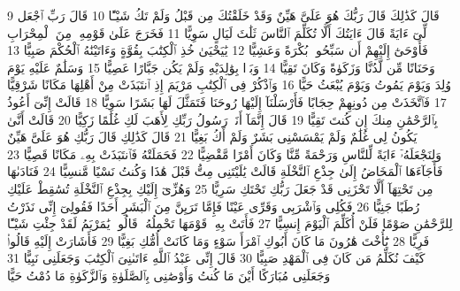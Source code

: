 {\tiny\colorbox{cl_aya}{9}} قَالَ كَذَٰلِكَ قَالَ رَبُّكَ هُوَ عَلَىَّ هَيِّنٌ وَقَدْ خَلَقْتُكَ مِن قَبْلُ وَلَمْ تَكُ شَيْـًٔا
{\tiny\colorbox{cl_aya}{10}} قَالَ رَبِّ ٱجْعَل لِّىٓ ءَايَةً قَالَ ءَايَتُكَ أَلَّا تُكَلِّمَ ٱلنَّاسَ ثَلَٰثَ لَيَالٍ سَوِيًّا
{\tiny\colorbox{cl_aya}{11}} فَخَرَجَ عَلَىٰ قَوْمِهِۦ مِنَ ٱلْمِحْرَابِ فَأَوْحَىٰٓ إِلَيْهِمْ أَن سَبِّحُوا۟ بُكْرَةً وَعَشِيًّا
{\tiny\colorbox{cl_aya}{12}} يَٰيَحْيَىٰ خُذِ ٱلْكِتَٰبَ بِقُوَّةٍ وَءَاتَيْنَٰهُ ٱلْحُكْمَ صَبِيًّا
{\tiny\colorbox{cl_aya}{13}} وَحَنَانًا مِّن لَّدُنَّا وَزَكَوٰةً وَكَانَ تَقِيًّا
{\tiny\colorbox{cl_aya}{14}} وَبَرًّۢا بِوَٰلِدَيْهِ وَلَمْ يَكُن جَبَّارًا عَصِيًّا
{\tiny\colorbox{cl_aya}{15}} وَسَلَٰمٌ عَلَيْهِ يَوْمَ وُلِدَ وَيَوْمَ يَمُوتُ وَيَوْمَ يُبْعَثُ حَيًّا
{\tiny\colorbox{cl_aya}{16}} وَٱذْكُرْ فِى ٱلْكِتَٰبِ مَرْيَمَ إِذِ ٱنتَبَذَتْ مِنْ أَهْلِهَا مَكَانًا شَرْقِيًّا
{\tiny\colorbox{cl_aya}{17}} فَٱتَّخَذَتْ مِن دُونِهِمْ حِجَابًا فَأَرْسَلْنَآ إِلَيْهَا رُوحَنَا فَتَمَثَّلَ لَهَا بَشَرًا سَوِيًّا
{\tiny\colorbox{cl_aya}{18}} قَالَتْ إِنِّىٓ أَعُوذُ بِٱلرَّحْمَٰنِ مِنكَ إِن كُنتَ تَقِيًّا
{\tiny\colorbox{cl_aya}{19}} قَالَ إِنَّمَآ أَنَا۠ رَسُولُ رَبِّكِ لِأَهَبَ لَكِ غُلَٰمًا زَكِيًّا
{\tiny\colorbox{cl_aya}{20}} قَالَتْ أَنَّىٰ يَكُونُ لِى غُلَٰمٌ وَلَمْ يَمْسَسْنِى بَشَرٌ وَلَمْ أَكُ بَغِيًّا
{\tiny\colorbox{cl_aya}{21}} قَالَ كَذَٰلِكِ قَالَ رَبُّكِ هُوَ عَلَىَّ هَيِّنٌ وَلِنَجْعَلَهُۥٓ ءَايَةً لِّلنَّاسِ وَرَحْمَةً مِّنَّا وَكَانَ أَمْرًا مَّقْضِيًّا
{\tiny\colorbox{cl_aya}{22}} فَحَمَلَتْهُ فَٱنتَبَذَتْ بِهِۦ مَكَانًا قَصِيًّا
{\tiny\colorbox{cl_aya}{23}} فَأَجَآءَهَا ٱلْمَخَاضُ إِلَىٰ جِذْعِ ٱلنَّخْلَةِ قَالَتْ يَٰلَيْتَنِى مِتُّ قَبْلَ هَٰذَا وَكُنتُ نَسْيًا مَّنسِيًّا
{\tiny\colorbox{cl_aya}{24}} فَنَادَىٰهَا مِن تَحْتِهَآ أَلَّا تَحْزَنِى قَدْ جَعَلَ رَبُّكِ تَحْتَكِ سَرِيًّا
{\tiny\colorbox{cl_aya}{25}} وَهُزِّىٓ إِلَيْكِ بِجِذْعِ ٱلنَّخْلَةِ تُسَٰقِطْ عَلَيْكِ رُطَبًا جَنِيًّا
{\tiny\colorbox{cl_aya}{26}} فَكُلِى وَٱشْرَبِى وَقَرِّى عَيْنًا فَإِمَّا تَرَيِنَّ مِنَ ٱلْبَشَرِ أَحَدًا فَقُولِىٓ إِنِّى نَذَرْتُ لِلرَّحْمَٰنِ صَوْمًا فَلَنْ أُكَلِّمَ ٱلْيَوْمَ إِنسِيًّا
{\tiny\colorbox{cl_aya}{27}} فَأَتَتْ بِهِۦ قَوْمَهَا تَحْمِلُهُۥ قَالُوا۟ يَٰمَرْيَمُ لَقَدْ جِئْتِ شَيْـًٔا فَرِيًّا
{\tiny\colorbox{cl_aya}{28}} يَٰٓأُخْتَ هَٰرُونَ مَا كَانَ أَبُوكِ ٱمْرَأَ سَوْءٍ وَمَا كَانَتْ أُمُّكِ بَغِيًّا
{\tiny\colorbox{cl_aya}{29}} فَأَشَارَتْ إِلَيْهِ قَالُوا۟ كَيْفَ نُكَلِّمُ مَن كَانَ فِى ٱلْمَهْدِ صَبِيًّا
{\tiny\colorbox{cl_aya}{30}} قَالَ إِنِّى عَبْدُ ٱللَّهِ ءَاتَىٰنِىَ ٱلْكِتَٰبَ وَجَعَلَنِى نَبِيًّا
{\tiny\colorbox{cl_aya}{31}} وَجَعَلَنِى مُبَارَكًا أَيْنَ مَا كُنتُ وَأَوْصَٰنِى بِٱلصَّلَوٰةِ وَٱلزَّكَوٰةِ مَا دُمْتُ حَيًّا
